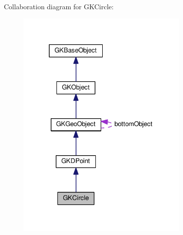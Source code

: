 Collaboration diagram for G\+K\+Circle\+:
\nopagebreak
\begin{figure}[H]
\begin{center}
\leavevmode
\includegraphics[width=240pt]{classGKCircle__coll__graph}
\end{center}
\end{figure}
